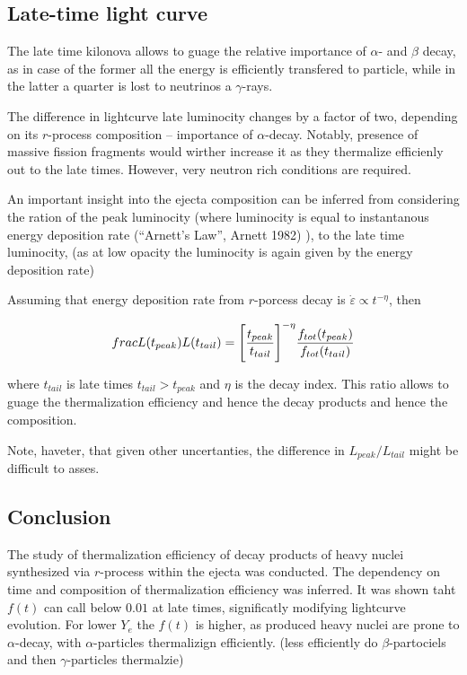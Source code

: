 \documentclass[11pt,a4paper,headinclude=true,DIV=14,BCOR=8mm,chapterprefix,listof=totoc,twoside,openright,abstracton]{scrbook}
\begin{document}

\subsection{Late-time light curve}

The late time kilonova allows to guage the relative importance of $\alpha$- and $\beta$ decay, as in case of the former all the energy is efficiently transfered to particle, while in the latter a quarter is lost to neutrinos a $\gamma$-rays.

The difference in lightcurve late luminocity changes by a factor of two, depending on its $r$-process composition -- importance of $\alpha$-decay. 
Notably, presence of massive fission fragments would wirther increase it as they thermalize efficienly out to the late times. However, very neutron rich conditions are required.

An important insight into the ejecta composition can be inferred from considering the ration of the peak luminocity (where luminocity is equal to instantanous energy deposition rate (“Arnett’s Law”, Arnett 1982) ), to the late time luminocity, (as at low opacity the luminocity is again given by the energy deposition rate)

Assuming that energy deposition rate from $r$-porcess decay is $\dot{\varepsilon}\propto t^{-\eta}$, 
then

\begin{equation}
    \\frac{L(t_{peak})}{L(t_{tail})}  = \Bigg[\frac{t_{peak}}{t_{tail}}\Bigg]^{-\eta} \frac{f_{tot}(t_{peak})}{f_{tot}(t_{tail})}
\end{equation}

where $t_{tail}$ is late times $t_{tail}>t_{peak}$ and $\eta$ is the decay index. 
This ratio allows to guage the thermalization efficiency and hence the decay products and hence the composition. 

Note, haveter, that given other uncertanties, the difference in $L_{peak}/L_{tail}$ might be difficult to asses.


\subsection{Conclusion}

The study of thermalization efficiency of decay products of heavy nuclei synthesized via $r$-process within the ejecta was conducted. The dependency on time and composition of thermalization efficiency was inferred. It was shown taht $f(t)$ can call below $0.01$ at late times, significatly modifying lightcurve evolution. For lower $Y_e$ the $f(t)$ is higher, as produced heavy nuclei are prone to $\alpha$-decay, with $\alpha$-particles thermalizign efficiently. (less efficiently do $\beta$-partociels and then $\gamma$-particles thermalzie)
\end{document}
